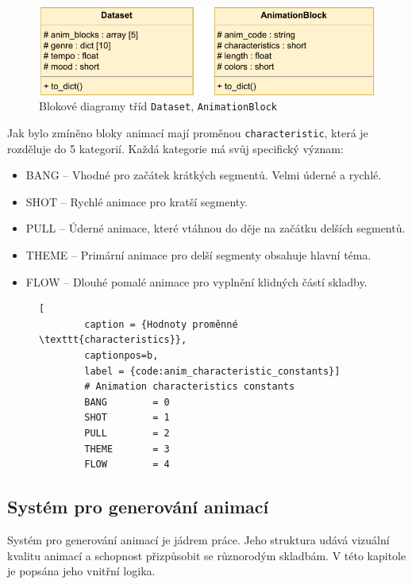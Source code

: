 \begin{figure}[H]
    \centering
    \includegraphics[width = 0.7\linewidth]{obrazky/UML_diagram_Dataset_and_AnimationBlock.pdf}
    \caption{Blokové diagramy tříd \texttt{Dataset}, \texttt{AnimationBlock}}
    \label{fig:UML_diagram_Dataset_AnimationBlock}
\end{figure}

Jak bylo zmíněno bloky animací mají proměnou \texttt{characteristic}, která je rozděluje do 5 kategorií. Každá kategorie má svůj specifický význam: 

\begin{itemize}
    \item BANG -- Vhodné pro začátek krátkých segmentů. Velmi úderné a rychlé.
    \item SHOT -- Rychlé animace pro kratší segmenty.
    \item PULL -- Úderné animace, které vtáhnou do děje na začátku delších segmentů.
    \item THEME -- Primární animace pro delší segmenty obsahuje hlavní téma.
    \item FLOW -- Dlouhé pomalé animace pro vyplnění klidných částí skladby.
\end{itemize}

\begin{figure}[H]
    \begin{lstlisting}[
        caption = {Hodnoty proměnné \texttt{characteristics}},
        captionpos=b,
        label = {code:anim_characteristic_constants}]
        # Animation characteristics constants
        BANG        = 0
        SHOT        = 1
        PULL        = 2
        THEME       = 3
        FLOW        = 4
    \end{lstlisting}
\end{figure}

\subsection{Systém pro generování animací} \label{sec:System_generovani_animaci}
Systém pro generování animací je jádrem práce. Jeho struktura udává vizuální kvalitu animací a schopnost přizpůsobit se různorodým skladbám. V této kapitole je popsána jeho vnitřní logika.

